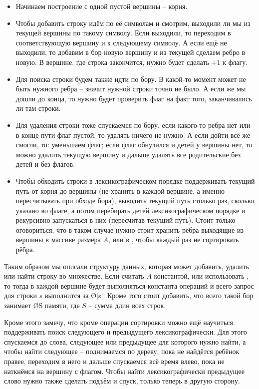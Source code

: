 \begin{itemize}
    \item Начинаем построение с одной пустой вершины -- корня.
    \item Чтобы добавить строку идём по её символам и смотрим, выходили ли мы из текущей вершины по такому символу. Если выходили, то переходим в соответствующую вершину и к следующему символу. А если ещё не выходили, то добавим в бор новую вершину и из текущей сделаем ребро в новую. В вершине, где строка закончится, нужно будет сделать $+1$ к флагу.
    \item Для поиска строки будем также идти по бору. В какой-то момент может не быть нужного ребра -- значит нужной строки точно не было. А если же мы дошли до конца, то нужно будет проверить флаг на факт того, заканчивались ли там строки.
    \item Для удаления строки тоже спускаемся по бору, если какого-то ребра нет или в конце пути флаг пустой, то удалять ничего не нужно. А если дойти всё же смогли, то: уменьшаем флаг; если флаг обнулился и детей у вершины нет, то можно удалить текущую вершину и дальше удалять все родительские без детей и без флагов.
    \item Чтобы обходить строки в лексикографическом порядке поддерживать текущий путь от корня до вершины (не хранить в каждой вершине, а именно пересчитывать при обходе бора), выводить текущий путь столько раз, сколько указано во флаге, а потом перебирать детей лексикографическом порядке и рекурсивно запускаться в них (пересчитав текущий путь). Стоит только оговориться, что в таком случае нужно стоит хранить рёбра выходящие из вершины в массиве размера $A$, или в , чтобы каждый раз не сортировать рёбра.
\end{itemize}

Таким образом мы описали структуру данных, которая может добавить, удалить или найти строку во множестве. Если считать $A$ константой, или использовать , то тогда в каждой вершине будет выполняться константа операций и всего запрос для строки $s$ выполнится за \O{|s|}. Кроме того стоит добавить, что всего такой бор занимает \O{S} памяти, где $S$ -- сумма длин всех строк.

Кроме этого замечу, что кроме операции сортировки можно ещё научиться поддерживать поиск следующего и предыдущего лексикографически. Для этого спускаемся до слова, следующее или предыдущее для которого нужно найти, а чтобы найти следующее -- поднимаемся по дереву, пока не найдётся ребёнок правее, переходим в него и дальше спускаемся всё время влево, пока не наткнёмся на вершину с флагом. Чтобы найти лексикографически предыдущее слово нужно также сделать подъём и спуск, только теперь в другую сторону.

